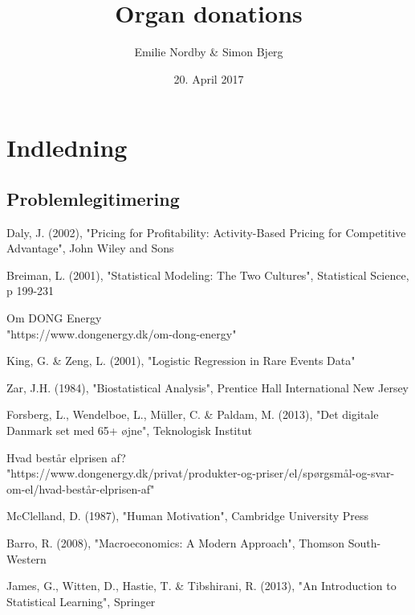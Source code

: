 \documentclass[a4paper,12pt]{article}
\title{Organ donations}
\author{Emilie Nordby \& Simon Bjerg}
\date{20. April 2017}
\begin{document}
\maketitle
\newpage
\begin{abstract}


\end{abstract}	
\newpage
\tableofcontents

\newpage
\section{Indledning}

\subsection{Problemlegitimering}



\newpage
\begin{thebibliography}{9}

Daly, J. (2002), "Pricing for Profitability: Activity-Based Pricing for Competitive Advantage", John Wiley and Sons

Breiman, L. (2001), "Statistical Modeling: The Two Cultures", Statistical Science, p 199-231

Om DONG Energy \\
"https://www.dongenergy.dk/om-dong-energy"

King, G. \& Zeng, L. (2001), "Logistic Regression in Rare Events Data"

Zar, J.H. (1984), "Biostatistical Analysis", Prentice Hall International New Jersey

Forsberg, L., Wendelboe, L., Müller, C. \& Paldam, M. (2013), "Det digitale Danmark set med 65+ øjne", Teknologisk Institut

Hvad består elprisen af? \\
"https://www.dongenergy.dk/privat/produkter-og-priser/el/spørgsmål-og-svar-om-el/hvad-består-elprisen-af"

McClelland, D. (1987), "Human Motivation", Cambridge University Press

Barro, R. (2008), "Macroeconomics: A Modern Approach", Thomson South-Western

James, G., Witten, D., Hastie, T. \& Tibshirani, R. (2013), "An Introduction to Statistical Learning", Springer



\end{thebibliography}	
	
\end{document}

